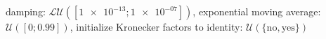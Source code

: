 damping: $\mathcal{LU}([\num[scientific-notation=true]{1e-13}; \num[scientific-notation=true]{1e-07}])$, exponential moving average: $\mathcal{U}([\num[scientific-notation=false]{0}; \num[scientific-notation=true]{0.99}])$, initialize Kronecker factors to identity: $\mathcal{U}(\{\text{no},\text{yes}\})$